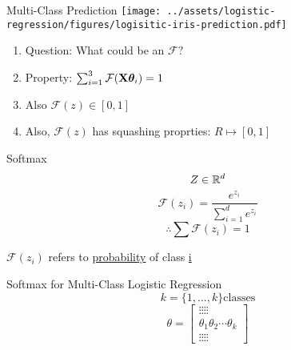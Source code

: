\documentclass{beamer}
\begin{document}
\begin{frame}{Multi-Class Prediction}
\texttt{[image: ../assets/logistic-regression/figures/logisitic-iris-prediction.pdf]}
\pause \begin{enumerate}
	\item Question: What could be an $\mathcal{F}?$
	\item Property: $\sum_{i=1}^{3}\mathcal{F}{({\mathbf{X}\boldsymbol{\theta}_i})} = 1$
	\item Also $\mathcal{F}(z)\in [0, 1]$
	\item Also, $\mathcal{F}(z)$ has squashing proprties: $R \mapsto [0, 1]$
\end{enumerate}


\end{frame}
\begin{frame}{Softmax}
\begin{equation*}
Z \in \mathbb{R}^{d}
\end{equation*}
\begin{equation*}
\mathcal{F}(z_{i}) = \frac{e^{z_{i}}}{\sum_{i=1}^{d}e^{z_{i}}}
\end{equation*}
\begin{equation*}
\therefore \sum \mathcal{F}(z_{i}) = 1
\end{equation*}

$\mathcal{F}(z_{i})$ refers to \underline{probability} of class \underline{i}
\end{frame}
\begin{frame}{Softmax for Multi-Class Logistic Regression}
\begin{equation*}
k = \{1, \ldots, k\} \text{classes}
\end{equation*}
$$
\theta=\left[\begin{array}{llll}
{\vdots} {\vdots} {\vdots} {\vdots} \\
{\theta_{1}} {\theta_{2}} {\cdots} {\theta_{k}} \\
{\vdots} {\vdots} {\vdots} {\vdots} 	
\end{array}\right]
$$
\centering
{}
\end{frame}
\end{document}
